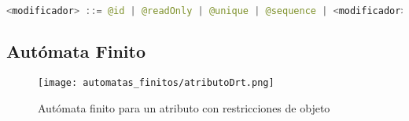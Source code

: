 \begin{lstlisting}[language=Java, basicstyle=\tiny\ttfamily, label=frag:bnf_atributo_modif]
		<modificador> ::= @id | @readOnly | @unique | @sequence | <modificador>
\end{lstlisting}

\subsection{Autómata Finito}
\begin{figure}[H]
	\centering
	\texttt{[image: automatas\_finitos/atributoDrt.png]}
	\caption{Autómata finito para un atributo con restricciones de objeto}
	\label{fig:af_atr_modif}
\end{figure}
